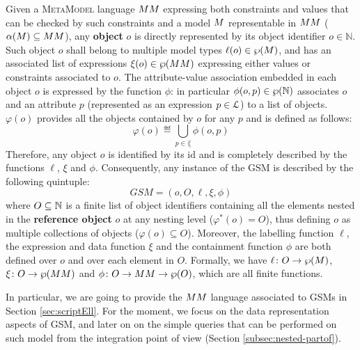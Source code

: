 \begin{definition}
Given a \textsc{MetaModel}  language $\metamodel$ expressing both constraints and values that can be checked by such constraints and a model $\model$ representable in $\metamodel$ ($\abstr(\model)\subseteq\metamodel$), any \textbf{object} $o$ is directly represented by its object identifier $o\in \mathbb{N}$. Such object $o$ shall belong to multiple model types $\ell(o)\in\partof{\model}$, and has an associated list of expressions $\xi(o)\in\partof{\metamodel}$ expressing either values or constraints associated to $o$. The attribute-value association embedded in each object $o$ is expressed by the function $\phi$: in particular $\phi(o,p)\in\wp(\mathbb{N})$ associates $o$ and an attribute $p$ (represented as an expression $p\in\langg$) to a list of objects. $\varphi(o)$ provides all the objects contained by $o$ for any $p$ and is defined as follows:
\[\varphi(o)\eqdef \bigcup_{p\in\lang}\phi(o,p)\]
Therefore, any object $o$ is identified by its id and is completely described by the functions $\ell$, $\xi$ and $\phi$. Consequently, any instance of the GSM is described by the following quintuple:
\[GSM=(o,O,\ell,\xi,\phi)\]
where $O\subseteq \mathbb{N}$ is a finite list of object identifiers containing all the elements nested in the \textbf{reference object} $o$ at any nesting level ($\varphi^*(o)=O$), thus defining $o$ as multiple collections of objects ($\varphi(o)\subseteq O$). Moreover, the labelling function $\ell$, the expression and data function $\xi$ and the containment function $\phi$ are both defined over $o$ and over each element in $O$. Formally, we have $\ell\colon O\to \partof{\model}$, $\xi\colon O\to \partof{\metamodel}$ and $\phi\colon O\to \metamodel\to\partof{O}$, which are all finite functions.

\end{definition}

In particular, we are going to provide the $\metamodel$ language associated to GSMs in Section \vref{sec:scriptEll}. For the moment, we  focus on the data representation aspects of GSM, and later on on the simple queries that can be performed on such model from the integration point of view (Section \vref{subsec:nested-partof}). 

